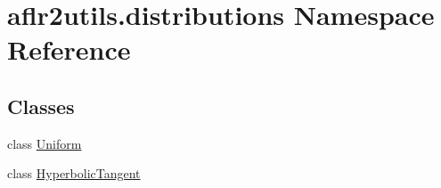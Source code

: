 \hypertarget{namespaceaflr2utils_1_1distributions}{\section{aflr2utils.\-distributions Namespace Reference}
\label{namespaceaflr2utils_1_1distributions}
}
\subsection*{Classes}
\begin{DoxyCompactItemize}
\item 
class \hyperlink{classaflr2utils_1_1distributions_1_1Uniform}{Uniform}
\item 
class \hyperlink{classaflr2utils_1_1distributions_1_1HyperbolicTangent}{Hyperbolic\-Tangent}
\end{DoxyCompactItemize}
